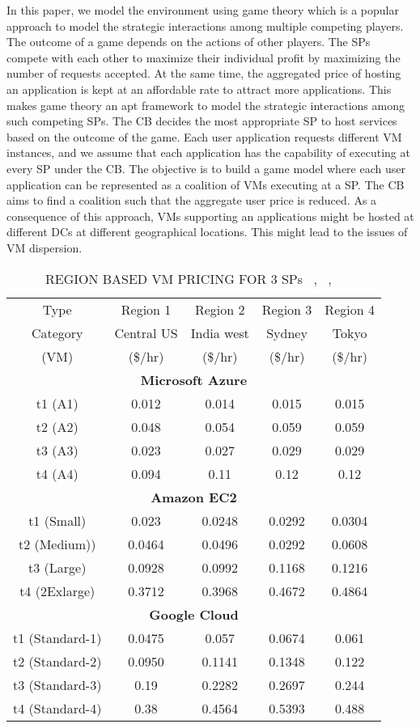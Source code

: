 \documentclass[12pt,a4paper,twoside,openright]{report}
\newcommand\tab[1][0.8cm]{\hspace*{#1}}
\begin{document}
\tab In this paper, we model the environment using game theory
which is a popular approach to model the strategic interactions
among multiple competing players. The outcome of a game
depends on the actions of other players. The SPs compete with
each other to maximize their individual profit by maximizing
the number of requests accepted. At the same time, the aggregated price of hosting an application is kept at an affordable
rate to attract more applications. This makes game theory
an apt framework to model the strategic interactions among
such competing SPs. The CB decides the most appropriate
SP to host services based on the outcome of the game.
Each user application requests different VM instances, and we
assume that each application has the capability of executing
at every SP under the CB. The objective is to build a game
model where each user application can be represented as a
coalition of VMs executing at a SP. The CB aims to find a
coalition such that the aggregate user price is reduced. As a
consequence of this approach, VMs supporting an applications
might be hosted at different DCs at different geographical
locations. This might lead to the issues of VM dispersion.
\begin{table}[htbp!]
	\caption{REGION BASED VM PRICING FOR 3 SPs ~\cite{b5}, ~\cite{b6}, ~\cite{b7}}
	\begin{center}
		\begin{tabular}{c|c|c|c|c}
			\hline
			Type & Region 1 & Region 2 & Region 3 & Region 4\\
			Category & Central US & India west & Sydney & Tokyo\\
			(VM) & (\$/hr) & (\$/hr) & (\$/hr) & (\$/hr)\\
			\hline
			\multicolumn{5}{c}{	\textbf{Microsoft Azure}}\\
			\hline
			t1 (A1) & 0.012 & 0.014 & 0.015 & 0.015\\
			t2 (A2) & 0.048 & 0.054 & 0.059 & 0.059\\
			t3 (A3) & 0.023 & 0.027 & 0.029 & 0.029\\
			t4 (A4) & 0.094 & 0.11 & 0.12 & 0.12\\
			\hline
			\multicolumn{5}{c}{	\textbf{Amazon EC2}}\\
			\hline
			t1 (Small) & 0.023 & 0.0248 & 0.0292 & 0.0304\\
			t2 (Medium)) & 0.0464 & 0.0496 & 0.0292 & 0.0608\\
			t3 (Large) & 0.0928 & 0.0992 & 0.1168 & 0.1216\\
			t4 (2Exlarge) & 0.3712 & 0.3968 & 0.4672 & 0.4864\\
			\hline
			\multicolumn{5}{c}{	\textbf{Google Cloud}}\\
			\hline
			t1 (Standard-1) & 0.0475 & 0.057 & 0.0674 & 0.061\\
			t2 (Standard-2) & 0.0950 & 0.1141 & 0.1348 & 0.122\\
			t3 (Standard-3) & 0.19 & 0.2282 & 0.2697 & 0.244\\
			t4 (Standard-4) & 0.38 & 0.4564 & 0.5393 & 0.488\\
			\hline
		\end{tabular}
		\label{tab1}
	\end{center}
\end{table}
\end{document}
